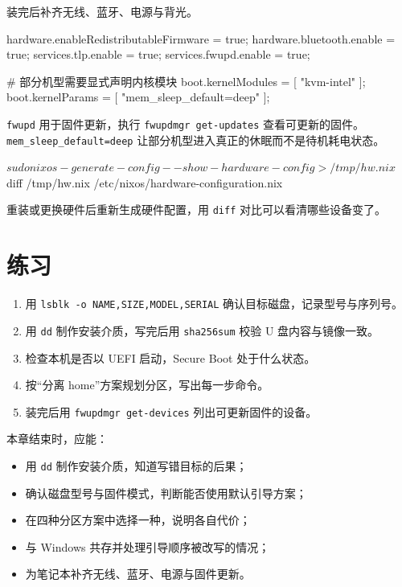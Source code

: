 装完后补齐无线、蓝牙、电源与背光。

\begin{nixcode}
hardware.enableRedistributableFirmware = true;
hardware.bluetooth.enable = true;
services.tlp.enable = true;
services.fwupd.enable = true;

# 部分机型需要显式声明内核模块
boot.kernelModules = [ "kvm-intel" ];
boot.kernelParams = [ "mem_sleep_default=deep" ];
\end{nixcode}

\texttt{fwupd} 用于固件更新，执行 \texttt{fwupdmgr get-updates} 查看可更新的固件。\texttt{mem\_sleep\_default=deep} 让部分机型进入真正的休眠而不是待机耗电状态。

\begin{shellsession}
$ sudo nixos-generate-config --show-hardware-config > /tmp/hw.nix
$ diff /tmp/hw.nix /etc/nixos/hardware-configuration.nix
\end{shellsession}

重装或更换硬件后重新生成硬件配置，用 \texttt{diff} 对比可以看清哪些设备变了。

\section{练习}

\begin{enumerate}
  \item 用 \texttt{lsblk -o NAME,SIZE,MODEL,SERIAL} 确认目标磁盘，记录型号与序列号。
  \item 用 \texttt{dd} 制作安装介质，写完后用 \texttt{sha256sum} 校验 U 盘内容与镜像一致。
  \item 检查本机是否以 UEFI 启动，Secure Boot 处于什么状态。
  \item 按“分离 home”方案规划分区，写出每一步命令。
  \item 装完后用 \texttt{fwupdmgr get-devices} 列出可更新固件的设备。
\end{enumerate}

\begin{checkpoint}
本章结束时，应能：
\begin{itemize}
  \item 用 \texttt{dd} 制作安装介质，知道写错目标的后果；
  \item 确认磁盘型号与固件模式，判断能否使用默认引导方案；
  \item 在四种分区方案中选择一种，说明各自代价；
  \item 与 Windows 共存并处理引导顺序被改写的情况；
  \item 为笔记本补齐无线、蓝牙、电源与固件更新。
\end{itemize}
\end{checkpoint}
